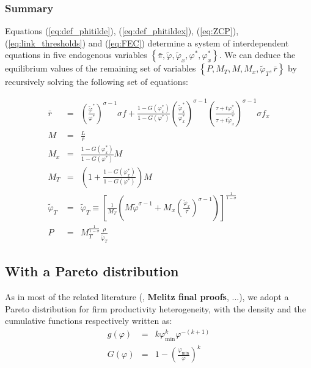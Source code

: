 \documentclass[a4paper,11pt]{article}
\begin{document}
\subsubsection{Summary}

Equations (\ref{eq:def_phitilde}), (\ref{eq:def_phitildex}), (\ref{eq:ZCP}), (\ref{eq:link_thresholds}) and (\ref{eq:FEC}) determine a system of interdependent equations in five endogenous variables $\left\{\bar{\pi}, \widetilde{\varphi}, \widetilde{\varphi}_x, \varphi^\ast, \varphi^\ast_x \right\}$. We can deduce the equilibrium values of the remaining set of variables $\left\{P, M_T, M, M_x, \widetilde{\varphi}_T, \bar{r} \right\}$ by recursively solving the following set of equations:

\begin{eqnarray*}
 \bar{r}&=& \left(\frac{\widetilde{\varphi}^\ast}{\varphi^\ast}\right)^{\sigma-1} \sigma f + \frac{1-G(\varphi^\ast_x)}{1-G(\varphi^\ast)}\left(\frac{\widetilde{\varphi}_x^\ast}{\varphi_x^\ast}\right)^{\sigma-1}\left(\frac{\tau+ t \varphi^\ast_x}{\tau+ t \widetilde{\varphi}^\ast_x}\right)^{\sigma-1} \sigma f_x \\
 M &=& \frac{L}{\bar{r}} \\
M_x &=& \frac{1-G(\varphi^\ast_x)}{1-G(\varphi^\ast)} M \\
M_T &=& \left(1+ \frac{1-G(\varphi^\ast_x)}{1-G(\varphi^\ast)} \right)M \\
\widetilde{\varphi}_T &=& \widetilde{\varphi}_T \equiv \left[\frac{1}{M_T}\left(M\widetilde{\varphi}^{\sigma-1} + M_x \left( \frac{\widetilde{\varphi}_x}{\tau} \right)^{\sigma-1} \right)  \right]^{\frac{1}{1-\sigma}} \\
P &=& M_T^{\frac{1}{1-\sigma}} \frac{\rho}{\widetilde{\varphi}_T}
\end{eqnarray*}


\subsection{With a Pareto distribution}


As in most of the related literature (\cite{Irrazabal_2015}, \textbf{Melitz final proofs}, ...), we adopt a Pareto distribution for firm productivity heterogeneity, with the density and the cumulative functions respectively written as:
\begin{eqnarray*}
g(\varphi) &=& k\varphi_{\text{min}}^k \varphi^{-(k+1)}\\
G(\varphi) &=& 1 -\left( \frac{\varphi_{\text{min}}}{\varphi} \right)^k
\end{eqnarray*}
\end{document}

